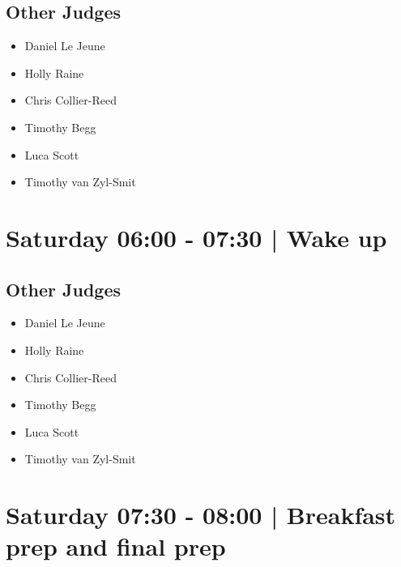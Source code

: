 \documentclass[10pt]{article}
\begin{document}
                
        \subsection*{Other Judges}
        
            \begin{itemize}
                            \item Daniel Le Jeune
                            \item Holly Raine
                            \item Chris Collier-Reed
                            \item Timothy Begg
                            \item Luca Scott
                            \item Timothy van Zyl-Smit
                        \end{itemize}
        

            \section*{Saturday 06:00
        -
        07:30
        |
         Wake up}
        
                
        \subsection*{Other Judges}
        
            \begin{itemize}
                            \item Daniel Le Jeune
                            \item Holly Raine
                            \item Chris Collier-Reed
                            \item Timothy Begg
                            \item Luca Scott
                            \item Timothy van Zyl-Smit
                        \end{itemize}
        

            \section*{Saturday 07:30
        -
        08:00
        |
         Breakfast prep and final prep}
        
\end{document}
